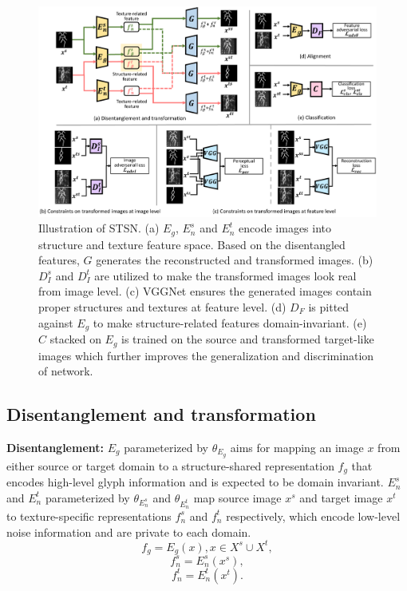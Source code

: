 \documentclass[10pt,journal,compsoc,twocolumn ]{IEEEtran}
\begin{document}
\begin{figure}
\centering
\includegraphics[width=16cm]{architecture1.pdf}
\caption{Illustration of STSN. (a) $E_g$, $E_n^s$ and $E_n^t$ encode images into structure and texture feature space. Based on the disentangled features, $G$ generates the reconstructed and transformed images. (b) $D_I^s$ and $D_I^t$ are utilized to make the transformed images look real from image level. (c) VGGNet ensures the generated images contain proper structures and textures at feature level. (d) $D_F$ is pitted against $E_g$ to make structure-related features domain-invariant. (e) $C$ stacked on $E_g$ is trained on the source and transformed target-like images which further improves the generalization and discrimination of network. }
\label{architecture} %
\end{figure}

\subsection{Disentanglement and transformation} \label{encoder and generator}
\textbf{Disentanglement:} $E_g$ parameterized by $\theta_{E_g}$ aims for mapping an image $x$ from either source or target domain to a structure-shared representation $f_g$ that encodes high-level glyph information and is expected to be domain invariant. $E_n^s$ and $E_n^t$ parameterized by $\theta_{E_n^s}$ and $\theta_{E_n^t}$ map source image $x^s$ and target image $x^t$ to texture-specific representations $f_n^s$ and $f_n^t$ respectively, which encode low-level noise information and are private to each domain.
\begin{equation}
f_g= E_g\left (x\right ), x\in X^s\cup X^t,
\end{equation}
\begin{equation}
f^s_n = E^s_n\left (x^s\right ),
\end{equation}
\begin{equation}
f^t_n = E^t_n\left (x^t\right ).
\end{equation}
\end{document}
